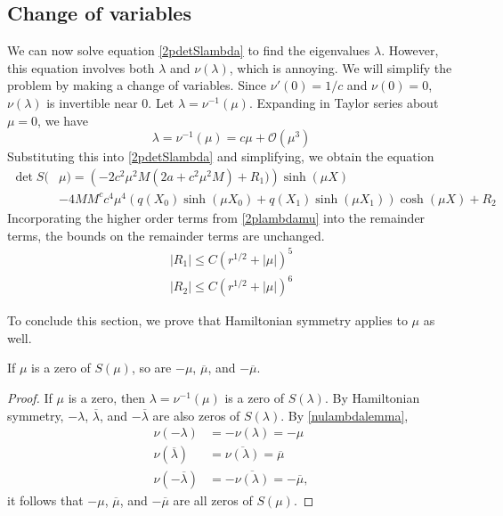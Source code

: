\documentclass[thesis.tex]{subfiles}
\begin{document}
\subsection{Change of variables}

We can now solve equation \cref{2pdetSlambda} to find the eigenvalues $\lambda$. However, this equation involves both $\lambda$ and $\nu(\lambda)$, which is annoying. We will simplify the problem by making a change of variables. Since $\nu'(0) = 1/c$ and $\nu(0) = 0$, $\nu(\lambda)$ is invertible near 0. Let $\lambda = \nu^{-1}(\mu)$. Expanding in Taylor series about $\mu = 0$, we have
\begin{equation}\label{2plambdamu}
\lambda = \nu^{-1}(\mu) = c \mu + \mathcal{O}(\mu^3)
\end{equation}
Substituting this into \cref{2pdetSlambda} and simplifying, we obtain the equation
\begin{equation}\label{2detBeqmu}
\begin{aligned}
\det S(&\mu) = \left(-2 c^2 \mu^2 M (2a + c^2 \mu^2 M) + R_1 )\right) \sinh(\mu X) \\
&-4 M M^c c^4 \mu^4 ( q(X_0) \sinh(\mu X_0) + q(X_1) \sinh(\mu X_1) ) \cosh(\mu X) + R_2
\end{aligned}
\end{equation}
Incorporating the higher order terms from \cref{2plambdamu} into the remainder terms, the bounds on the remainder terms are unchanged.
\begin{equation}\label{muRbounds}
\begin{aligned}
|R_1| \leq C(r^{1/2} + |\mu|)^5 \\
|R_2| \leq C(r^{1/2} + |\mu|)^6
\end{aligned}
\end{equation}

To conclude this section, we prove that Hamiltonian symmetry applies to $\mu$ as well.

\begin{lemma}\label{lemma:Hamsymmmu}
If $\mu$ is a zero of $S(\mu)$, so are $-\mu$, $\overline{\mu}$, and $-\overline{\mu}$.
\begin{proof}
If $\mu$ is a zero, then $\lambda = \nu^{-1}(\mu)$ is a zero of $S(\lambda)$. By Hamiltonian symmetry, $-\lambda$, $\overline{\lambda}$, and $-\overline{\lambda}$ are also zeros of $S(\lambda)$. By \cref{nulambdalemma},
\begin{align*}
\nu(-\lambda) &= -\nu(\lambda) = -\mu \\
\nu(\overline{\lambda}) &= \overline{ \nu(\lambda) } = \overline{\mu} \\
\nu(-\overline{\lambda}) &= -\overline{ \nu(\lambda) } = -\overline{\mu},
\end{align*}
it follows that $-\mu$, $\overline{\mu}$, and $-\overline{\mu}$ are all zeros of $S(\mu)$.
\end{proof}
\end{lemma}
\end{document}
